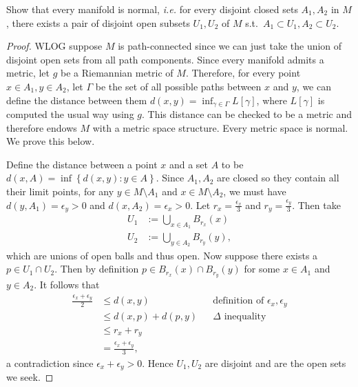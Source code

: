 \documentclass[12pt]{article}
\begin{document}
\begin{problem}[LN13 0.9]
Show that every manifold is normal, \emph{i.e.} for every disjoint closed sets $ A_1, A_2$ in $ M$, there exists a pair of disjoint open subsets  $ U_1,U_2$ of $ M$  s.t.\ $ A_1 \subset U_1, A_2 \subset U_2$.
\end{problem}
\begin{proof}
	WLOG suppose $ M$ is path-connected since we can just take the union of disjoint open sets from all path components. Since every manifold admits a metric, let $ g$ be a Riemannian metric of  $ M$.  Therefore, for every point $ x \in A_1, y \in A_2$, let $ \Gamma$ be the set of all possible paths between $ x$ and  $ y$, we can define the distance between them $ d(x,y) = \inf_{ \gamma \in \Gamma}L[ \gamma]  $, where $ L[\gamma]$ is computed the usual way using $ g$. This distance can be checked to be a metric and therefore endows $ M$ with a metric space structure. Every metric space is normal. We prove this below.

	Define the distance between a point $ x$ and a set $ A$ to be  $ d(x,A) = \inf\left\{ d(x,y): y \in A \right\} $. Since $ A_1, A_2$ are closed so they contain all their limit points, for any $ y \in M\setminus A_1$ and $ x \in M \setminus A_2$, we must have $ d(y,A_1) = \epsilon_y > 0 $ and $ d(x, A_2) = \epsilon_x > 0$. Let $ r_x = \frac{ \epsilon_x}{ 3}$ and $ r_y = \frac{ \epsilon_y}{ 3}$. Then take
	\begin{align*}
		U_1 &:= \bigcup_{ x \in A_1} B_{ r_x}(x) \\
		U_2 &:= \bigcup_{ y \in A_2} B_{ r_y}(y) ,
	\end{align*}
which are unions of open balls and thus open. Now suppose there exists a $ p \in U_1 \cap U_2$. Then by definition $ p \in B_{r_x}(x) \cap B_{r_y}(y)$ for some $ x \in A_1$ and $ y \in A_2$. It follows that
\begin{align*}
	\frac{ \epsilon_x + \epsilon_y}{ 2} &\leq d(x,y) && \text{definition of } \epsilon_x, \epsilon_y  \\
					    &\leq d(x,p) + d(p,y) && \Delta \text{ inequality}  \\
	&\leq r_x + r_y  \\
	&= \frac{ \epsilon_x + \epsilon_y}{ 3} ,
\end{align*}
a contradiction since $ \epsilon_x + \epsilon_y >0$. Hence $ U_1,U_2$ are disjoint and are the open sets we seek.
\end{proof}
\end{document}
